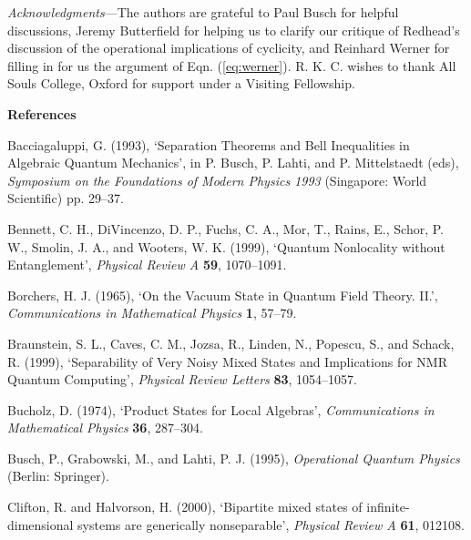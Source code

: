 \documentclass[12pt]{article}
\begin{document}
 \noindent \emph{Acknowledgments}---The authors are grateful to Paul 
Busch for helpful discussions, Jeremy Butterfield for helping us to 
clarify our critique of Redhead's discussion of the operational 
implications of cyclicity, and 
Reinhard Werner for filling in for us the argument of Eqn. 
(\ref{eq:werner}).  R. K. C. wishes to thank All Souls College, Oxford 
for support under a Visiting Fellowship.  

     \begin{center} {\bf References} \end{center} 
 
 \noindent Bacciagaluppi, G. (1993), `Separation Theorems and Bell 
 Inequalities in Algebraic Quantum Mechanics',  in P. Busch, P. Lahti, 
 and P. 
Mittelstaedt (eds), \emph{Symposium on the Foundations of Modern 
Physics 1993} (Singapore: World Scientific) pp. 29--37.\vspace{.1in}  
  
  \noindent Bennett, C. H., DiVincenzo, D. P., Fuchs, C. A.,  
Mor, T., Rains, E., Schor, P. W., Smolin, J. A., and Wooters, W. K. 
(1999), 
`Quantum Nonlocality without Entanglement', \emph{Physical Review A} 
\textbf{59}, 1070--1091.\vspace{.1in}

\noindent Borchers, H. J. (1965), `On the Vacuum State in Quantum 
Field Theory.  II.', \emph{Communications in Mathematical Physics} 
\textbf{1}, 57--79.\vspace{.1in}

\noindent Braunstein, S. L., Caves, C. M., Jozsa, R., Linden, N., Popescu, S., 
and Schack, R. (1999), `Separability of Very Noisy Mixed States and 
Implications for NMR Quantum Computing', \emph{Physical Review 
Letters} \textbf{83}, 1054--1057.\vspace{.1in}

\noindent Bucholz, D. (1974), `Product States for Local Algebras', 
\emph{Communications in Mathematical Physics} \textbf{36}, 
287--304.\vspace{.1in}

\noindent Busch, P., Grabowski, M., and 
Lahti, P. J. (1995), \emph{Operational Quantum Physics} (Berlin: Springer).\vspace{.1in}

\noindent Clifton, R. and Halvorson, H. (2000), `Bipartite mixed states of
infinite-dimensional systems are generically nonseparable', 
\emph{Physical Review A} \textbf{61}, 012108.\vspace{.1in}
\end{document}
